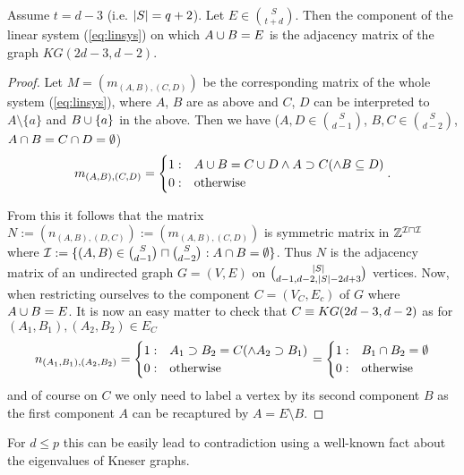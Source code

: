 \documentclass[a4paper]{article}
\begin{document}
\begin{lemma}
  Assume $t=d-3$ (i.e. $\left|S\right|=q+2$).
  Let $E\in\binom{S}{t+d}$. Then the component of the linear system (\ref{eq:linsys}) on which $A\cup B=E$ is the adjacency matrix of the graph $KG(2d-3,d-2)$.
\end{lemma} 

\begin{proof}
  Let $M=(m_{(A,B),(C,D)})$ be the corresponding matrix of the whole system (\ref{eq:linsys}), where $A$, $B$ are as above and $C$, $D$ can be interpreted to $A\setminus\{a\}$ and $B\cup\{a\}$ in the above.
  Then we have ($A,D\in\binom{S}{d-1}$, $B,C\in\binom{S}{d-2}$, $A\cap B=C\cap D = \emptyset$)
  \begin{equation}
    m_{(A,B),(C,D)}=
    \begin{cases}
      1 :& A\cup B = C\cup D \wedge A\supset C (\wedge B\subseteq D)\\
      0 :& \text{otherwise}  
    \end{cases}\text{.}
  \end{equation}

  From this it follows that the matrix $N:=(n_{(A,B),(D,C)}):=(m_{(A,B),(C,D)})$ is symmetric matrix in $\mathbb{Z}^{\mathcal{I}\mathbin{\sqcap}\mathcal{I}}$ where $\mathcal{I}:=\{(A,B)\in\binom{S}{d-1}\times\binom{S}{d-2}:A\setmeet B=\emptyset\}$. Thus $N$ is the adjacency matrix of an undirected graph $G=(V,E)$ on $\binom{\card{S}}{d-1,d-2,\card{S}-2d+3}$ vertices.
  Now, when restricting ourselves to the component $C=(V_C,E_c)$ of $G$ where $A\cup B=E$. It is now an easy matter to check that $C\iso KG(2d-3,d-2)$ as for $(A_1,B_1),(A_2,B_2)\in E_C$
  \begin{equation}
    n_{(A_1,B_1),(A_2,B_2)}=
    \begin{cases}
      1 :& A_1\supset B_2 = C (\wedge A_2\supset B_1)\\
      0 :& \text{otherwise}  
    \end{cases}
    =
    \begin{cases}
      1 :& B_1\cap B_2 = \emptyset\\
      0 :& \text{otherwise}  
    \end{cases}
  \end{equation}
  and of course on $C$ we only need to label a vertex by its second component $B$ as the first component $A$ can be recaptured by $A=E\setminus B$.
\end{proof}

For $d\leq p$ this can be easily lead to contradiction using a well-known fact about the eigenvalues of Kneser graphs.
\end{document}
